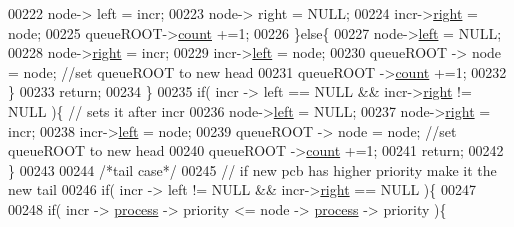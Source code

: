 \begin{DoxyCode}
{00222                         node-> left = incr;
00223                         node-> right = NULL;
00224                         incr->\hyperlink{structpage_a72bca7218659f6f6e4e94cc0bacc26d1}{right} = node;
00225                         queueROOT->\hyperlink{structroot_afa78d0408d4af29e936332a04739d59c}{count} +=1;
00226                 \}\textcolor{keywordflow}{else}\{
00227                         node->\hyperlink{structpage_aea88d51a55db952658327da1995fc8aa}{left} = NULL;
00228                         node->\hyperlink{structpage_a72bca7218659f6f6e4e94cc0bacc26d1}{right} = incr;
00229                         incr->\hyperlink{structpage_aea88d51a55db952658327da1995fc8aa}{left} = node;
00230                         queueROOT -> node = node; \textcolor{comment}{//set queueROOT to new head}
00231                         queueROOT ->\hyperlink{structroot_afa78d0408d4af29e936332a04739d59c}{count} +=1;
00232                 \}
00233                 \textcolor{keywordflow}{return};
00234         \}
00235         \textcolor{keywordflow}{if}( incr -> left == NULL && incr->\hyperlink{structpage_a72bca7218659f6f6e4e94cc0bacc26d1}{right} != NULL )\{ \textcolor{comment}{// sets it after incr}
00236                 node->\hyperlink{structpage_aea88d51a55db952658327da1995fc8aa}{left} = NULL;
00237                 node->\hyperlink{structpage_a72bca7218659f6f6e4e94cc0bacc26d1}{right} = incr;
00238                 incr->\hyperlink{structpage_aea88d51a55db952658327da1995fc8aa}{left} = node;
00239                 queueROOT -> node = node; \textcolor{comment}{//set queueROOT to new head}
00240                 queueROOT ->\hyperlink{structroot_afa78d0408d4af29e936332a04739d59c}{count} +=1;
00241                 \textcolor{keywordflow}{return};
00242         \}
00243         
00244         \textcolor{comment}{/*tail case*/}
00245         \textcolor{comment}{// if new pcb has higher priority make it the new tail}
00246         \textcolor{keywordflow}{if}( incr -> left != NULL && incr->\hyperlink{structpage_a72bca7218659f6f6e4e94cc0bacc26d1}{right} == NULL )\{
00247                 
00248                 \textcolor{keywordflow}{if}( incr -> \hyperlink{structprocess}{process} -> priority <= node -> \hyperlink{structprocess}{process} -> priority )\{
      
}
\end{DoxyCode}
